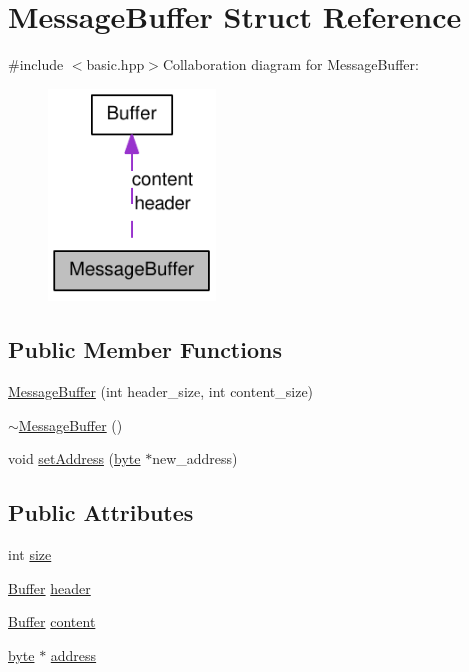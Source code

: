 \hypertarget{struct_message_buffer}{
\section{MessageBuffer Struct Reference}
\label{struct_message_buffer}
}


{\ttfamily \#include $<$basic.hpp$>$}Collaboration diagram for MessageBuffer:\nopagebreak
\begin{figure}[H]
\begin{center}
\leavevmode
\includegraphics[width=126pt]{struct_message_buffer__coll__graph}
\end{center}
\end{figure}
\subsection*{Public Member Functions}
\begin{DoxyCompactItemize}
\item 
\hyperlink{struct_message_buffer_a1879023de683ba2b29f94281d6ecd2a8}{MessageBuffer} (int header\_\-size, int content\_\-size)
\item 
\hyperlink{struct_message_buffer_a9b75bc9b932dd5ac39c35b35b4f18a80}{$\sim$MessageBuffer} ()
\item 
void \hyperlink{struct_message_buffer_a23d67ca3db34d5fefab3215b90433dec}{setAddress} (\hyperlink{engine_8hpp_a0c8186d9b9b7880309c27230bbb5e69d}{byte} $\ast$new\_\-address)
\end{DoxyCompactItemize}
\subsection*{Public Attributes}
\begin{DoxyCompactItemize}
\item 
int \hyperlink{struct_message_buffer_a312b0b881f953e7297e09babf07ad310}{size}
\item 
\hyperlink{struct_buffer}{Buffer} \hyperlink{struct_message_buffer_a8980cf66ff82d8e41272c71b7eed95cf}{header}
\item 
\hyperlink{struct_buffer}{Buffer} \hyperlink{struct_message_buffer_aacb71926287db561ee1be822b3c22c29}{content}
\item 
\hyperlink{engine_8hpp_a0c8186d9b9b7880309c27230bbb5e69d}{byte} $\ast$ \hyperlink{struct_message_buffer_a3904730ac874f087e0d523ec5583a786}{address}
\end{DoxyCompactItemize}


